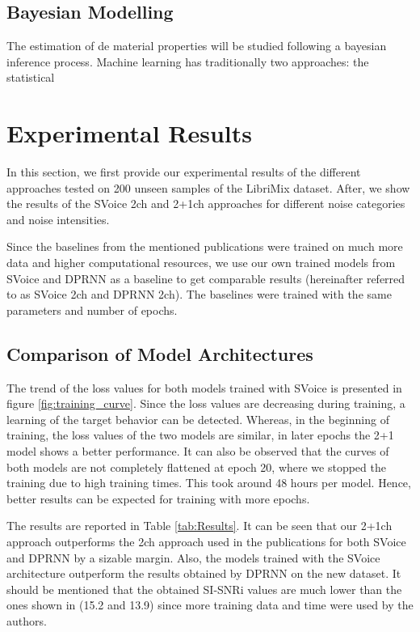 \documentclass{article}
\begin{document}
\subsection{Bayesian Modelling}
The estimation of de material properties will be studied following a bayesian inference process. Machine learning has traditionally two approaches: the statistical

\section{Experimental Results}
\label{sec:experimental_results}
In this section, we first provide our experimental results of the different approaches tested on 200 unseen samples of the LibriMix dataset. After, we show the results of the SVoice 2ch and 2+1ch approaches for different noise categories and noise intensities. 

Since the baselines from the mentioned publications were trained on much more data and higher computational resources, we use our own trained models from SVoice and DPRNN as a baseline to get comparable results (hereinafter referred to as SVoice 2ch and DPRNN 2ch). The baselines were trained with the same parameters and number of epochs.
\subsection{Comparison of Model Architectures}
\label{ssec:comparison_model_architectures}


The trend of the loss values for both models trained with SVoice is presented in figure \ref{fig:training_curve}. Since the loss values are decreasing during training, a learning of the target behavior can be detected. Whereas, in the beginning of training, the loss values of the two models are similar, in later epochs the 2+1 model  shows a better performance. It can also be observed that the curves of both models are not completely flattened at epoch 20, where we stopped the training due to high training times. This took around 48 hours per model. Hence, better results can be expected for training with more epochs. 

 The results are reported in Table \ref{tab:Results}. It can be seen that our 2+1ch approach outperforms the 2ch approach used in the publications for both SVoice and DPRNN by a sizable margin. Also, the models trained with the SVoice architecture outperform the results obtained by DPRNN on the new dataset. It should be mentioned that the obtained SI-SNRi values are much lower than the ones shown in \cite{Svoice} (15.2 and 13.9) since more training data and time were used by the authors.
\end{document}

